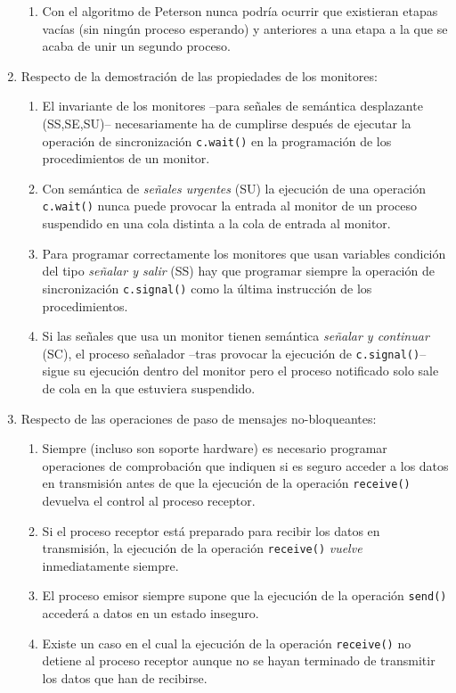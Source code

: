 \documentclass[12pt]{article}
\begin{document}
\begin{ejercicio}
\begin{enumerate}
\begin{enumerate}[label=(\alph*)]
                    \item Con el algoritmo de Peterson nunca podría ocurrir que existieran etapas vacías (sin ningún proceso esperando) y anteriores a una etapa a la que se acaba de unir un segundo proceso.
                \end{enumerate}
            \item Respecto de la demostración de las propiedades de los monitores:
                \begin{enumerate}[label=(\alph*)]
                    \item El invariante de los monitores –para señales de semántica desplazante (SS,SE,SU)– necesariamente ha de cumplirse después de ejecutar la operación de sincronización \verb|c.wait()| en la programación de los procedimientos de un monitor.
                    \item Con semántica de \textit{señales urgentes} (SU) la ejecución de una operación \verb|c.wait()| nunca puede provocar la entrada al monitor de un proceso suspendido en una cola distinta a la cola de entrada al monitor.
                    \item Para programar correctamente los monitores que usan variables condición del tipo \textit{señalar y salir} (SS) hay que programar siempre la operación de sincronización \verb|c.signal()| como la última instrucción de los procedimientos.
                    \item Si las señales que usa un monitor tienen semántica \textit{señalar y continuar} (SC), el proceso señalador –tras provocar la ejecución de \verb|c.signal()|– sigue su ejecución dentro del monitor pero el proceso notificado solo sale de cola en la que estuviera suspendido.
                \end{enumerate}
            \item Respecto de las operaciones de paso de mensajes no-bloqueantes:
                \begin{enumerate}[label=(\alph*)]
                    \item Siempre (incluso son soporte hardware) es necesario programar operaciones de comprobación que indiquen si es seguro acceder a los datos en transmisión antes de que la ejecución de la operación \verb|receive()| devuelva el control al proceso receptor.
                    \item Si el proceso receptor está preparado para recibir los datos en transmisión, la ejecución de la operación \verb|receive()| \textit{vuelve} inmediatamente siempre.
                    \item El proceso emisor siempre supone que la ejecución de la operación \verb|send()| accederá a datos en un estado inseguro.
                    \item Existe un caso en el cual la ejecución de la operación \verb|receive()| no detiene al proceso receptor aunque no se hayan terminado de transmitir los datos que han de recibirse.
                \end{enumerate}
        \end{enumerate}
    \end{ejercicio}
\end{document}
